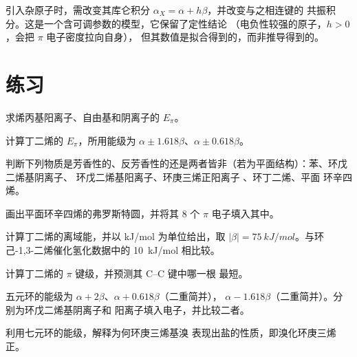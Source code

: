 引入杂原子时，需改变其库仑积分 $\alpha_X = \alpha + h\beta$，并改变与之相连键的
共振积分。这是一个含可调参数的模型，它保留了定性结论
（电负性较强的原子，$h > 0$，会把 $\pi$ 电子密度拉向自身），
但其数值是拟合得到的，而非推导得到的。

\section{练习}

\begin{exercise}[$\star$]\label{exo:b2:huckel:1}
求烯丙基阳离子、自由基和阴离子的 $E_\pi$。
\end{exercise}

\begin{exercise}[$\star$]\label{exo:b2:huckel:2}
计算丁二烯的 $E_\pi$，所用能级为 $\alpha \pm 1.618\beta$、$\alpha \pm 0.618\beta$。
\end{exercise}

\begin{exercise}[$\star$]\label{exo:b2:huckel:3}
判断下列物质是芳香性的、反芳香性的还是两者皆非（若为平面结构）：苯、环戊二烯基阴离子、
环戊二烯基阳离子、环庚三烯正阳离子 、环丁二烯、平面
环辛四烯。
\end{exercise}

\begin{exercise}[$\star$]\label{exo:b2:huckel:4}
画出平面环辛四烯的弗罗斯特圆，并将其 8 个 $\pi$ 电子填入其中。
\end{exercise}

\begin{exercise}[$\star\star$]\label{exo:b2:huckel:5}
计算丁二烯的离域能，并以 \unit{kJ/mol} 为单位给出，取
$|\beta| = \qty{75}{kJ/mol}$。与环己-1,3-二烯催化氢化数据中的
\qty{10}{kJ/mol} 相比较。
\end{exercise}

\begin{exercise}[$\star\star$]\label{exo:b2:huckel:6}
计算丁二烯的 $\pi$ 键级，并预测其 C--C 键中哪一根
最短。
\end{exercise}

\begin{exercise}[$\star\star$]\label{exo:b2:huckel:7}
五元环的能级为 $\alpha + 2\beta$、$\alpha + 0.618\beta$（二重简并），
$\alpha - 1.618\beta$（二重简并）。分别为环戊二烯基阴离子和
阳离子填入电子，并比较二者。
\end{exercise}

\begin{exercise}[$\star\star$]\label{exo:b2:huckel:8}
利用七元环的能级，解释为何环庚三烯基溴
表现出盐的性质，即溴化环庚三烯正。
\end{exercise}

